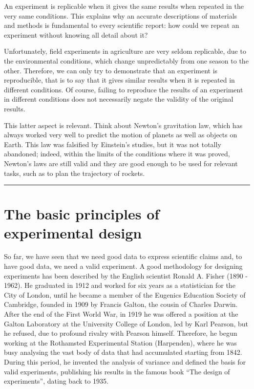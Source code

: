 \documentclass[a4paper,12pt,oneside]{book}
\begin{document}
An experiment is replicable when it gives the same results when repeated in the very same conditions. This explains why an accurate descriptions of materials and methods is fundamental to every scientific report: how could we repeat an experiment without knowing all detail about it?

Unfortunately, field experiments in agriculture are very seldom replicable, due to the environmental conditions, which change unpredictably from one season to the other. Therefore, we can only try to demonstrate that an experiment is reproducible, that is to say that it gives similar results when it is repeated in different conditions. Of course, failing to reproduce the results of an experiment in different conditions does not necessarily negate the validity of the original results.

This latter aspect is relevant. Think about Newton's gravitation law, which has always worked very well to predict the motion of planets as well as objects on Earth. This law was falsified by Einstein's studies, but it was not totally abandoned; indeed, within the limits of the conditions where it was proved, Newton's laws are still valid and they are good enough to be used for relevant tasks, such as to plan the trajectory of rockets.

\begin{center}\rule{0.5\linewidth}{0.5pt}\end{center}

\hypertarget{the-basic-principles-of-experimental-design}{%
\section{The basic principles of experimental design}\label{the-basic-principles-of-experimental-design}}

So far, we have seen that we need good data to express scientific claims and, to have good data, we need a valid experiment. A good methodology for designing experiments has been described by the English scientist Ronald A. Fisher (1890 - 1962). He graduated in 1912 and worked for six years as a statistician for the City of London, until he became a member of the Eugenics Education Society of Cambridge, founded in 1909 by Francis Galton, the cousin of Charles Darwin. After the end of the First World War, in 1919 he was offered a position at the Galton Laboratory at the University College of London, led by Karl Pearson, but he refused, due to profound rivalry with Pearson himself. Therefore, he begun working at the Rothamsted Experimental Station (Harpenden), where he was busy analysing the vast body of data that had accumulated starting from 1842. During this period, he invented the analysis of variance and defined the basis for valid experiments, publishing his results in the famous book ``The design of experiments'', dating back to 1935.
\end{document}
